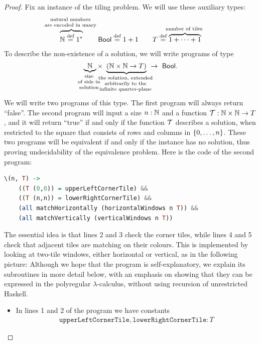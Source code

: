 \documentclass{article}
\begin{document}
\begin{proof}
Fix  an instance of the tiling problem. We  will use these auxiliary types: 
\begin{align*}
\myoverbrace{\Nat \eqdef 1^*}{natural numbers \\ are encoded in unary}\qquad \Bool \eqdef 1 + 1
\qquad T \eqdef \myoverbrace{ 1 + \cdots + 1}{number of tiles}
\end{align*}
To describe the non-existence of a solution, we will write programs of type 
\begin{align*}
 \myunderbrace{\Nat}{size\\  of   side in \\ solution} \times \ \myunderbrace{(\Nat \times \Nat \to T)}{the solution, extended \\ arbitrarily to the \\ infinite quarter-plane} \  \to  \  \Bool.
\end{align*}
We will write two programs of this type. The first program will always return ``false''. The second program will input a size $n : {\mathbb N}$ and a function ${\mathcal T} : {\mathbb N} \times {\mathbb N} \to T$, and it  will return ``true'' if and only if the function ${\mathcal T}$ describes a solution,  when restricted to the square that consists of rows and columns in $\{0,\ldots,n\}$.  These two programs will be equivalent if and only if the instance has no solution, thus proving undecidability of the equivalence problem. Here is the code of the second program:
\begin{lstlisting}[language=Haskell]
  \(n, T) ->
    ((T (0,0)) = upperLeftCornerTile) &&
    ((T (n,n)) = lowerRightCornerTile) &&
    (all matchHorizontally (horizontalWindows n T)) &&
    (all matchVertically (verticalWindows n T))
\end{lstlisting}
The essential idea is that lines 2 and 3 check the corner tiles, while lines 4 and 5 check that adjacent tiles are matching on their colours. This is implemented by looking at two-tile windows,  either horizontal or vertical, as in the following picture: 
Although we hope that the program is self-explanatory, we explain its subroutines in more detail below, with an emphasis on showing that they can be expressed in  the polyregular $\lambda$-calculus, without using recursion of unrestricted Haskell. 
\begin{itemize}
        \item  In lines 1 and 2 of the program we have  constants 
    \begin{align*}
    \mathtt{upperLeftCornerTile}, \mathtt{lowerRightCornerTile} : T
    \end{align*}

\end{itemize}
\end{proof}
\end{document}
